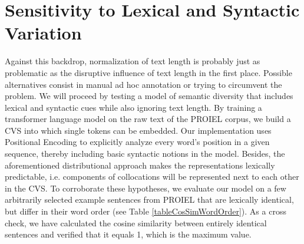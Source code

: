 \documentclass[oneside]{book}
\begin{document}
\section{Sensitivity to Lexical and Syntactic Variation}
Against this backdrop, normalization of text length is probably just as problematic as the disruptive influence of text length in the first place. Possible alternatives consist in manual ad hoc annotation or trying to circumvent the problem. We will proceed by testing a model of semantic diversity that includes lexical and syntactic cues while also ignoring text length. By training a transformer language model \parencite[9]{vaswaniAttentionAllYou2017} on the raw text of the PROIEL corpus, we build a \gls{CVS} into which single tokens can be embedded. Our implementation uses Positional Encoding \parencite[4]{conneauCrosslingualLanguageModel2019} to explicitly analyze every word's position in a given sequence, thereby including basic syntactic notions in the model. Besides, the aforementioned distributional approach makes the representations lexically predictable, i.e. components of collocations will be represented next to each other in the \gls{CVS}. To corroborate these hypotheses, we evaluate our model on a few arbitrarily selected example sentences from PROIEL that are lexically identical, but differ in their word order (see Table \ref{tableCosSimWordOrder}). As a cross check, we have calculated the cosine similarity between entirely identical sentences and verified that it equals 1, which is the maximum value.
\end{document}
